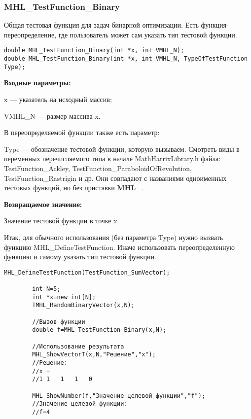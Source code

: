 \documentclass[a4paper,12pt]{article}
\begin{document}
\subsubsection{MHL\_TestFunction\_Binary}\label{MHL_TestFunction_Binary}

Общая тестовая функция для задач бинарной оптимизации. Есть функция-переопределение, где пользователь может сам указать тип тестовой функции.


\begin{lstlisting}[label=code_syntax_MHL_TestFunction_Binary,caption=Синтаксис]
double MHL_TestFunction_Binary(int *x, int VMHL_N);
double MHL_TestFunction_Binary(int *x, int VMHL_N, TypeOfTestFunction Type);
\end{lstlisting}

\textbf{Входные параметры:}

x --- указатель на исходный массив;

VMHL\_N --- размер массива x.

В переопределяемой функции также есть параметр:
  
Type --- обозначение тестовой функции, которую вызываем.
Смотреть виды в переменных перечисляемого типа в начале MathHarrixLibrary.h файла: TestFunction\_Ackley, TestFunction\_ParaboloidOfRevolution, TestFunction\_Rastrigin и др. Они совпадают с названиями одноименных тестовых функций, но без приставки \textbf{MHL\_}.

\textbf{Возвращаемое значение:}
 
Значение тестовой функции в точке x.

Итак, для обычного использования (без параметра Type) нужно вызвать функцию MHL\_DefineTestFunction. Иначе использовать переопределенную функцию и самому указать тип тестовой функции.


\begin{lstlisting}[label=code_use_MHL_TestFunction_Binary,caption=Пример использования]
        MHL_DefineTestFunction(TestFunction_SumVector);

        int N=5;
        int *x=new int[N];
        TMHL_RandomBinaryVector(x,N);

        //Вызов функции
        double f=MHL_TestFunction_Binary(x,N);

        //Использование результата
        MHL_ShowVectorT(x,N,"Решение","x");
        //Решение:
        //x =
        //1	1	1	1	0

        MHL_ShowNumber(f,"Значение целевой функции","f");
        //Значение целевой функции:
        //f=4
\end{lstlisting}
\end{document}
